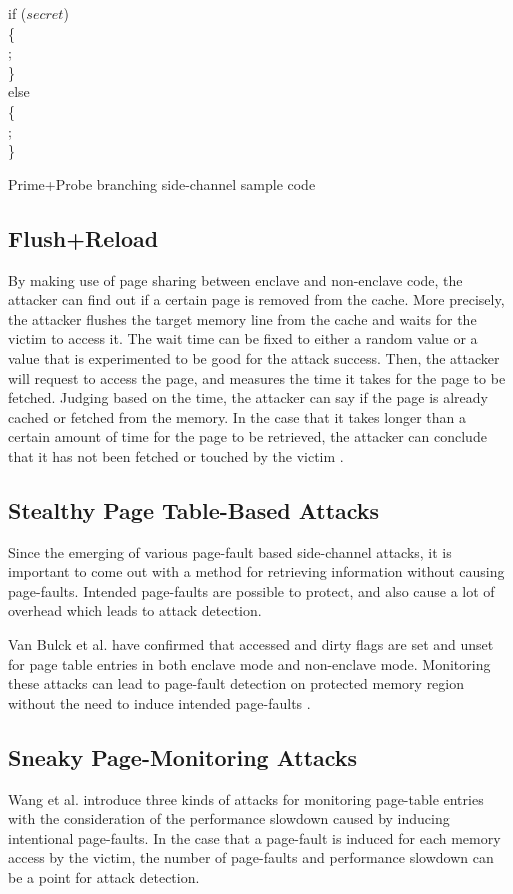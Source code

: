 \begin{algorithm}[t]
	\SetAlgoNoLine
	if ($secret$)
	\\\{\\
	\tab ;\\
	\}\\
	else\\
	\{\\
	\tab;\\
	\}
	\caption{Prime+Probe branching side-channel sample code \cite{stealthy,cloak}}
	\label{alg:one}
\end{algorithm}


\subsection{Flush+Reload}
By making use of page sharing between enclave and non-enclave code, the attacker can find out if a certain page is removed from the cache. More precisely, the attacker flushes the target memory line from the cache and waits for the victim to access it. The wait time can be fixed to either a random value or a value that is experimented to be good for the attack success. Then, the attacker will request to access the page, and measures the time it takes for the page to be fetched. Judging based on the time, the attacker can say if the page is already cached or fetched from the memory. In the case that it takes longer than a certain amount of time for the page to be retrieved, the attacker can conclude that it has not been fetched or touched by the victim \cite{flushreload}.

\subsection{Stealthy Page Table-Based Attacks}
Since the emerging of various page-fault based side-channel attacks, it is important to come out with a method for retrieving information without causing page-faults. Intended page-faults are possible to protect, and also cause a lot of overhead which leads to attack detection.

Van Bulck et al. \cite{stealthy} have confirmed that accessed and dirty flags are set and unset for page table entries in both enclave mode and non-enclave mode. Monitoring these attacks can lead to page-fault detection on protected memory region without the need to induce intended page-faults \cite{stealthy}.

\subsection{Sneaky Page-Monitoring Attacks}
Wang et al. \cite{leakycauldron} introduce three kinds of attacks for monitoring page-table entries with the consideration of the performance slowdown caused by inducing intentional page-faults. In the case that a page-fault is induced for each memory access by the victim, the number of page-faults and performance slowdown can be a point for attack detection.
